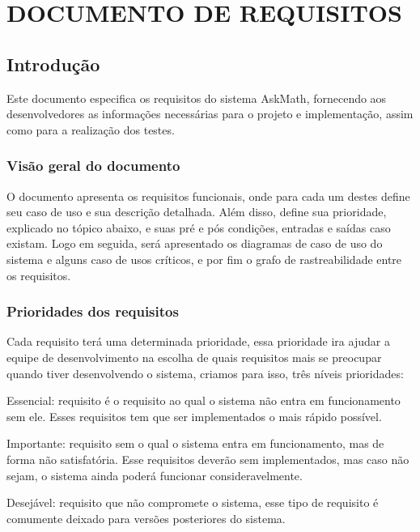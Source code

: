 \newpage
\chapter{DOCUMENTO DE REQUISITOS}\label{apendice_requisitos}

\section{Introdução}
Este documento especifica os requisitos do sistema AskMath, fornecendo aos desenvolvedores as informações necessárias para o projeto e implementação, assim como para a realização dos testes. 

\subsection{Visão geral do documento}
O documento apresenta os requisitos funcionais, onde para cada um destes define seu caso de uso e sua descrição detalhada. Além disso, define sua prioridade, explicado no tópico abaixo, e suas pré e pós condições, entradas e saídas caso existam. Logo em seguida, será apresentado os diagramas de caso de uso do sistema e alguns caso de usos críticos, e por fim o grafo de rastreabilidade entre os requisitos.

\subsection{Prioridades dos requisitos}
Cada requisito terá uma determinada prioridade, essa prioridade ira ajudar a equipe de desenvolvimento na escolha de quais requisitos mais se preocupar quando tiver desenvolvendo o sistema, criamos para isso, três níveis prioridades:

\begin{alineascomponto}
	\item Essencial: requisito é o requisito ao qual o sistema não entra em funcionamento sem ele. Esses requisitos tem que ser implementados o mais rápido possível. 
    \item Importante: requisito sem o qual o sistema entra em funcionamento, mas de forma não satisfatória. Esse requisitos deverão sem implementados, mas caso não sejam, o sistema ainda poderá funcionar consideravelmente.
	\item Desejável: requisito que não compromete o sistema, esse tipo de requisito é comumente deixado para versões posteriores do sistema.
\end{alineascomponto}

